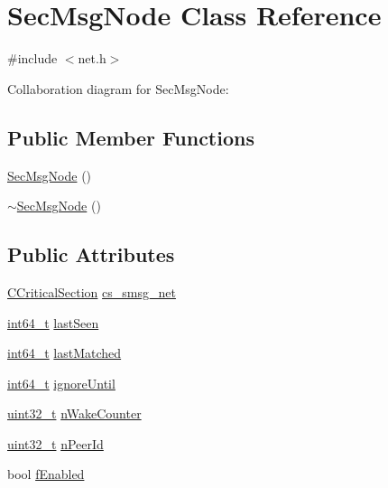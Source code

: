 \hypertarget{class_sec_msg_node}{}\section{Sec\+Msg\+Node Class Reference}
\label{class_sec_msg_node}


{\ttfamily \#include $<$net.\+h$>$}



Collaboration diagram for Sec\+Msg\+Node\+:
\subsection*{Public Member Functions}
\begin{DoxyCompactItemize}
\item 
\hyperlink{class_sec_msg_node_aa8202b34054a4dc8bb54178957c3c263}{Sec\+Msg\+Node} ()
\item 
\hyperlink{class_sec_msg_node_a4a8079ab19804b88e7777d8940d13c0d}{$\sim$\+Sec\+Msg\+Node} ()
\end{DoxyCompactItemize}
\subsection*{Public Attributes}
\begin{DoxyCompactItemize}
\item 
\hyperlink{sync_8h_a37a4692b2d517f2843655ca11af7668a}{C\+Critical\+Section} \hyperlink{class_sec_msg_node_a202af59c01df20a0c45e2ff068df544d}{cs\+\_\+smsg\+\_\+net}
\item 
\hyperlink{stdint_8h_adec1df1b8b51cb32b77e5b86fff46471}{int64\+\_\+t} \hyperlink{class_sec_msg_node_a3a2e08f929788ebfb517218788e29836}{last\+Seen}
\item 
\hyperlink{stdint_8h_adec1df1b8b51cb32b77e5b86fff46471}{int64\+\_\+t} \hyperlink{class_sec_msg_node_ac714be60c0566e644df2e0eb006a7817}{last\+Matched}
\item 
\hyperlink{stdint_8h_adec1df1b8b51cb32b77e5b86fff46471}{int64\+\_\+t} \hyperlink{class_sec_msg_node_a574e453a229ed2cbed30ca56727fa564}{ignore\+Until}
\item 
\hyperlink{stdint_8h_a435d1572bf3f880d55459d9805097f62}{uint32\+\_\+t} \hyperlink{class_sec_msg_node_a72aad5e6551e9c79fac326a2a2806844}{n\+Wake\+Counter}
\item 
\hyperlink{stdint_8h_a435d1572bf3f880d55459d9805097f62}{uint32\+\_\+t} \hyperlink{class_sec_msg_node_a325228e72957728b80d299001e831480}{n\+Peer\+Id}
\item 
bool \hyperlink{class_sec_msg_node_ad6b7ce67b38267e49c7f173855258800}{f\+Enabled}
\end{DoxyCompactItemize}


